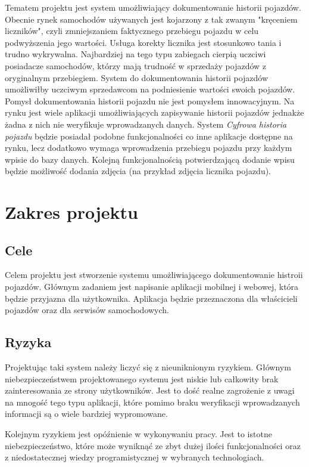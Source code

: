\documentclass[12pt]{article}
\begin{document}
Tematem projektu jest system umożliwiający dokumentowanie historii pojazdów. Obecnie rynek samochodów używanych jest kojarzony z tak zwanym "kręceniem liczników", czyli zmniejszaniem faktycznego przebiegu pojazdu w celu podwyższenia jego wartości. Usługa korekty licznika jest stosunkowo tania i trudno wykrywalna. Najbardziej na tego typu zabiegach cierpią uczciwi posiadacze samochodów, którzy mają trudność w sprzedaży pojazdów z oryginalnym przebiegiem. System do dokumentowania historii pojazdów umożliwiłby uczciwym sprzedawcom na podniesienie wartości swoich pojazdów. Pomysł dokumentowania historii pojazdu nie jest pomysłem innowacyjnym. Na rynku jest wiele aplikacji umożliwiających zapisywanie historii pojazdów jednakże żadna z nich nie weryfikuje wprowadzanych danych. System\textit{ Cyfrowa historia pojazdu} będzie posiadał podobne funkcjonalności co inne aplikacje dostępne na rynku, lecz dodatkowo wymaga wprowadzenia przebiegu pojazdu przy każdym wpisie do bazy danych. Kolejną funkcjonalnością potwierdzającą dodanie wpisu będzie możliwość dodania zdjęcia (na przykład zdjęcia licznika pojazdu).




\newpage
\section{Zakres projektu}
\subsection{Cele}
Celem projektu jest stworzenie systemu umożliwiającego dokumentowanie histroii pojazdów. Głównym zadaniem jest napisanie aplikacji mobilnej i webowej, która będzie przyjazna dla użytkownika. Aplikacja będzie przeznaczona dla właścicieli pojazdów oraz dla serwisów samochodowych. 
\subsection{Ryzyka}
Projektując taki system należy liczyć się z nieuniknionym ryzykiem. Głównym niebezpieczeństwem projektowanego systemu jest niskie lub całkowity brak zainteresowania ze strony użytkowników. Jest to dość realne zagrożenie z uwagi na mnogość tego typu aplikacji, które pomimo braku weryfikacji wprowadzanych informacji są o wiele bardziej wypromowane. 

Kolejnym ryzykiem jest opóźnienie w wykonywaniu pracy. Jest to istotne niebezpieczeństwo, które może wyniknąć ze zbyt dużej ilości funkcjonalności oraz z niedostatecznej wiedzy programistycznej w wybranych technologiach. 
\end{document}
